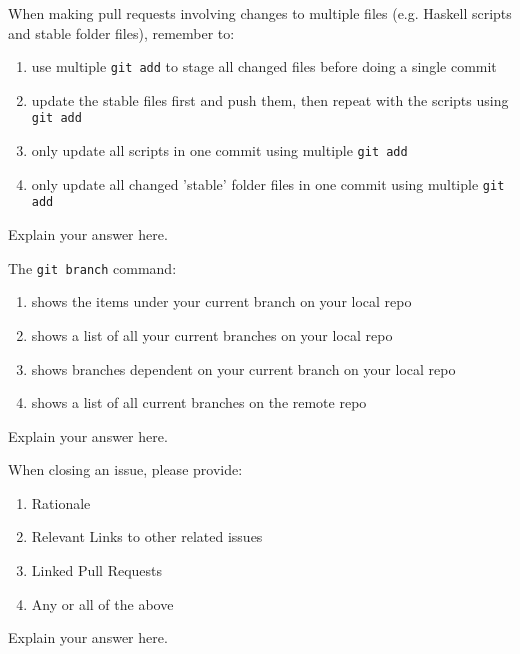 \documentclass[12pt,fleqn]{examtst}
\begin{document}

\newpage
\noindent
\begin{minipage}{\textwidth}

When making pull requests involving changes to multiple files (e.g. Haskell scripts and stable folder files), remember to:

\begin{enumerate}
    \item use multiple \lstinline{git add} to stage all changed files before doing a single commit \marker
    \item update the stable files first and push them, then repeat with the scripts using \lstinline{git add}
    \item only update all scripts in one commit using multiple \lstinline{git add}
    \item only update all changed 'stable' folder files in one commit using multiple \lstinline{git add}
\end{enumerate}
Explain your answer here.

The \lstinline{git branch} command:

\begin{enumerate}
    \item shows the items under your current branch on your local repo
    \item shows a list of all your current branches on your local repo \marker
    \item shows branches dependent on your current branch on your local repo
    \item shows a list of all current branches on the remote repo
\end{enumerate}
Explain your answer here.

When closing an issue, please provide:

\begin{enumerate}
    \item Rationale
    \item Relevant Links to other related issues
    \item Linked Pull Requests
    \item Any or all of the above \marker
\end{enumerate}
Explain your answer here.

\end{minipage}
\end{document}
